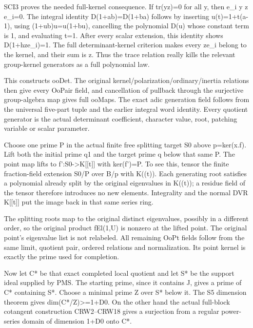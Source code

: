 SCI3 proves the needed full-kernel consequence. If tr(yz)=0 for all y, then e\_\allowbreak{}i y z e\_\allowbreak{}i=0. The integral identity D(1+ab)=D(1+ba) follows by inserting u(t)=1+t(a-1), using (1+ub)u=u(1+bu), cancelling the polynomial D(u) whose constant term is 1, and evaluating t=1. After every scalar extension, this identity shows D(1+hze\_\allowbreak{}i)=1. The full determinant-kernel criterion makes every ze\_\allowbreak{}i belong to the kernel, and their sum is z. Thus the trace relation really kills the relevant group-kernel generators as a full polynomial law.

This constructs ooDet. The original kernel/\allowbreak{}polarization/\allowbreak{}ordinary/\allowbreak{}inertia relations then give every OoPair field, and cancellation of pullback through the surjective group-algebra map gives full ooMaps. The exact adic generation field follows from the universal five-part tuple and the earlier integral word identity. Every quotient generator is the actual determinant coefficient, character value, root, patching variable or scalar parameter.

Choose one prime P in the actual finite free splitting target S0 above p=ker(x.f). Lift both the initial prime q1 and the target prime q below that same P. The point map lifts to f':S0->K[[t]] with ker(f')=P. To see this, tensor the finite fraction-field extension S0/\allowbreak{}P over B/\allowbreak{}p with K((t)). Each generating root satisfies a polynomial already split by the original eigenvalues in K((t)); a residue field of the tensor therefore introduces no new elements. Integrality and the normal DVR K[[t]] put the image back in that same series ring.

The splitting roots map to the original distinct eigenvalues, possibly in a different order, so the original product fEl(1,U) is nonzero at the lifted point. The original point's eigenvalue list is not relabeled. All remaining OoPt fields follow from the same limit, quotient pair, ordered relations and normalization. Its point kernel is exactly the prime used for completion.

Now let C* be that exact completed local quotient and let S* be the support ideal supplied by PMS. The starting prime, since it contains J, gives a prime of C* containing S*. Choose a minimal prime Z over S* below it. The S5 dimension theorem gives dim(C*/\allowbreak{}Z)>=1+D0. On the other hand the actual full-block cotangent construction CRW2–CRW18 gives a surjection from a regular power-series domain of dimension 1+D0 onto C*.

